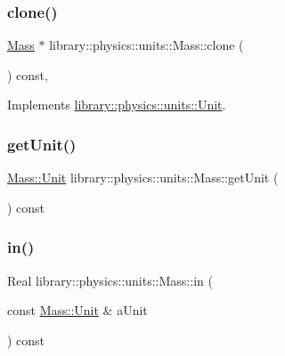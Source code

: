 \subsubsection{\texorpdfstring{clone()}{clone()}}
{\footnotesize\ttfamily \hyperlink{classlibrary_1_1physics_1_1units_1_1_mass}{Mass} $\ast$ library\+::physics\+::units\+::\+Mass\+::clone (\begin{DoxyParamCaption}{ }\end{DoxyParamCaption}) const\hspace{0.3cm}{\ttfamily [override]}, {\ttfamily [virtual]}}



Implements \hyperlink{classlibrary_1_1physics_1_1units_1_1_unit_aff727141d73acddfae382e5e375f4640}{library\+::physics\+::units\+::\+Unit}.

\mbox{\label{classlibrary_1_1physics_1_1units_1_1_mass_ab564abfc37cc17f2902445f06254082c}} 
\subsubsection{\texorpdfstring{get\+Unit()}{getUnit()}}
{\footnotesize\ttfamily \hyperlink{classlibrary_1_1physics_1_1units_1_1_mass_a95f1e0434bc16794926b8e273bc2a54b}{Mass\+::\+Unit} library\+::physics\+::units\+::\+Mass\+::get\+Unit (\begin{DoxyParamCaption}{ }\end{DoxyParamCaption}) const}

\mbox{\label{classlibrary_1_1physics_1_1units_1_1_mass_a85f4a66996e4b52fb5b3a71e42c4d6e3}} 
\subsubsection{\texorpdfstring{in()}{in()}}
{\footnotesize\ttfamily Real library\+::physics\+::units\+::\+Mass\+::in (\begin{DoxyParamCaption}\item[{const \hyperlink{classlibrary_1_1physics_1_1units_1_1_mass_a95f1e0434bc16794926b8e273bc2a54b}{Mass\+::\+Unit} \&}]{a\+Unit }\end{DoxyParamCaption}) const}

